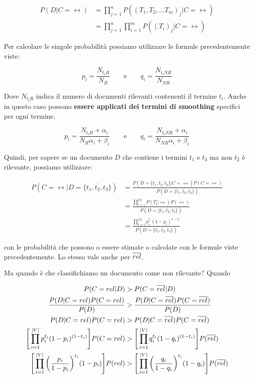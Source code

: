 \begin{align*}
P(D | C=\rel) &= \prod\limits_{j=1}^n P((T_{1},T_{2},\ldots T_{m})_j|C=\rel) \\
&= \prod\limits_{j=1}^n \prod\limits_{i=1}^m P((T_i)_j | C=\rel)
\end{align*}


\noindent Per calcolare le singole probabilità possiamo utilizzare le formule precedentemente viste:

$$
p_i = \frac{N_{t_iR}}{N_R} \qquad \text{e} \qquad q_i = \frac{N_{t_iNR}}{N_{NR}}
$$

\noindent Dove $N_{t_iR}$ indica il numero di documenti rilevanti contenenti il termine $t_i$. Anche in questo caso possono \textbf{essere applicati dei termini di smoothing} specifici per ogni termine.

$$
\boxed{p_i = \frac{N_{t_iR} + \alpha_i}{N_R \alpha_i + \beta_i}} \qquad \text{e} \qquad \boxed{q_i = \frac{N_{t_iNR} + \alpha_i}{N_{NR}\alpha_i + \beta_i}}
$$

Quindi, per sapere se un documento $D$ che contiene i termini $t_1$ e $t_3$ ma non $t_2$ è rilevante, possiamo utilizzare:

\begin{align*}
P(C=\rel | D=\{t_1, \overline{t_2}, t_3\}) &=\frac{ P( D=\{t_1, \overline{t_2}, t_3\} |C = \rel)P(C=\rel)}{P( D=\{t_1, \overline{t_2}, t_3\})} \\
                                           &=\frac{\prod\limits_{i=i}^{|V|} P(T_i | \rel)P(\rel) }{P( D=\{t_1, \overline{t_2}, t_3\})} \\
                                           &=\frac{\prod\limits_{i=i}^{|V|}p_{i}^{t_i}(1-p_i)^{1- t_i} }{P( D=\{t_1, \overline{t_2}, t_3\})}
\end{align*}

\noindent con le probabilità che possono o essere stimate o calcolate con le formule viste precedentemente. Lo stesso vale anche per $\overline{rel}$.

Ma quando è che classifichiamo un documento come non rilevante? Quando

\begin{align*}
									                        P(C=rel|D) &> P(C=\overline{rel} |D) \\
									\frac{P(D | C=rel)P(C=rel)}{P(D)} &> \frac{P(D | C=\overline{rel})P(C=\overline{rel})}{P(D)} \\
									             P(D | C=rel)P(C=rel) &> P(D | C=\overline{rel})P(C=\overline{rel}) \\
			\Bigg[\prod\limits_{i=1}^{|V|} p_{i}^{t_i} (1 - p_{i})^{(1-t_i)}\Bigg] P(C = rel) &> \Bigg[\prod\limits_{i=1}^{|V|} q_{i}^{t_i} (1 - q_{i})^{(1-t_i)}\Bigg]P(\overline{rel}) \\
  \Bigg[\prod\limits_{i=1}^{|V|} \bigg(\frac{ p_{i} }{1-p_i}\bigg)^{t_i} (1-p_i)\Bigg] P(rel) &>\Bigg[\prod\limits_{i=1}^{|V|} \bigg(\frac{ q_{i} }{1-q_i}\bigg)^{t_i} (1-q_i)\Bigg] P(\overline{rel})
\end{align*}

